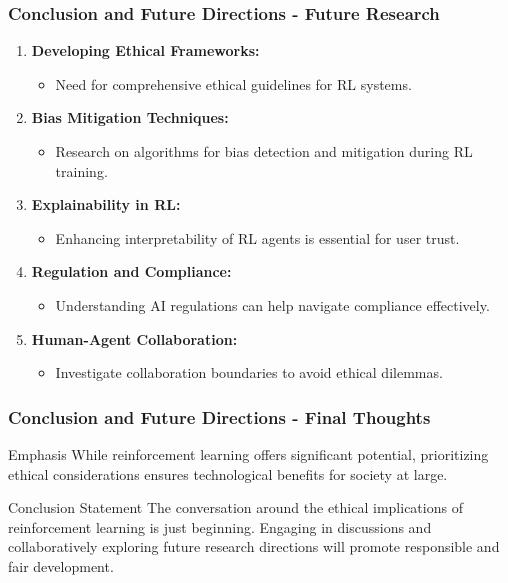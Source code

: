 \documentclass[aspectratio=169]{beamer}
\begin{document}
\begin{frame}[fragile]
    \frametitle{Conclusion and Future Directions - Future Research}
    \begin{enumerate}
        \item \textbf{Developing Ethical Frameworks:}
            \begin{itemize}
                \item Need for comprehensive ethical guidelines for RL systems.
            \end{itemize}
        \item \textbf{Bias Mitigation Techniques:}
            \begin{itemize}
                \item Research on algorithms for bias detection and mitigation during RL training.
            \end{itemize}
        \item \textbf{Explainability in RL:}
            \begin{itemize}
                \item Enhancing interpretability of RL agents is essential for user trust.
            \end{itemize}
        \item \textbf{Regulation and Compliance:}
            \begin{itemize}
                \item Understanding AI regulations can help navigate compliance effectively.
            \end{itemize}
        \item \textbf{Human-Agent Collaboration:}
            \begin{itemize}
                \item Investigate collaboration boundaries to avoid ethical dilemmas.
            \end{itemize}
    \end{enumerate}
\end{frame}

\begin{frame}[fragile]
    \frametitle{Conclusion and Future Directions - Final Thoughts}
    \begin{block}{Emphasis}
        While reinforcement learning offers significant potential, prioritizing ethical considerations ensures technological benefits for society at large.
    \end{block}
    \vspace{0.5cm}
    \begin{block}{Conclusion Statement}
        The conversation around the ethical implications of reinforcement learning is just beginning. Engaging in discussions and collaboratively exploring future research directions will promote responsible and fair development.
    \end{block}
\end{frame}
\end{document}
